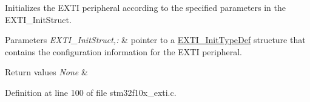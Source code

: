 Initializes the E\-X\-T\-I peripheral according to the specified parameters in the E\-X\-T\-I\-\_\-\-Init\-Struct. 


\begin{DoxyParams}{Parameters}
{\em E\-X\-T\-I\-\_\-\-Init\-Struct,\-:} & pointer to a \hyperlink{struct_e_x_t_i___init_type_def}{E\-X\-T\-I\-\_\-\-Init\-Type\-Def} structure that contains the configuration information for the E\-X\-T\-I peripheral. \\
\hline
\end{DoxyParams}

\begin{DoxyRetVals}{Return values}
{\em None} & \\
\hline
\end{DoxyRetVals}


Definition at line 100 of file stm32f10x\-\_\-exti.\-c.

